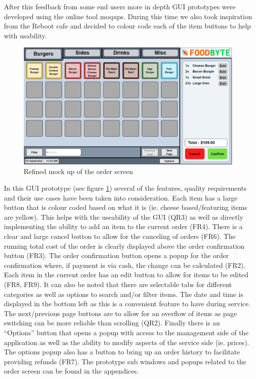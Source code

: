 After this feedback from some end users more in depth GUI prototypes were developed using the online tool moqups. During this time we also took inspiration from the Reboot cafe and decided to colour code each of the item buttons to help with usability.

\begin{figure}[ht]
	\centering
	\includegraphics[width=150mm]{images/GUI_prototypes/Order_screen.PNG}
	\caption{Refined mock up of the order screen}
	\label{fig:order_screen_moqueup}
\end{figure}

In this GUI prototype (see figure \ref{fig:order_screen_moqueup}) several of the features, quality requirements and their use cases have been taken into consideration. Each item has a large button that is colour coded based on what it is (ie. cheese based/featuring items are yellow). This helps with the useability of the GUI (QR3) as well as directly implementing the ability to add an item to the current order (FR4). There is a clear and large cancel button to allow for the canceling of orders (FR6). The running total cost of the order is clearly displayed above the order confirmation button (FR3). The order confirmation button opens a popup for the order confirmation where, if payment is via cash, the change can be calculated (FR2). Each item in the current order has an edit button to allow for items to be edited (FR8, FR9). It can also be noted that there are selectable tabs for different categories as well as options to search and/or filter items. The date and time is displayed in the bottom left as this is a convenient feature to have during service. The next/previous page buttons are to allow for an overflow of items as page switching can be more reliable than scrolling (QR2). Finally there is an “Options” button that opens a popup with access to the management side of the application as well as the ability to modify aspects of the service side (ie. prices). The options popup also has a button to bring up an order history to facilitate providing refunds (FR7).
The prototype sub windows and popups related to the order screen can be found in the appendices.

